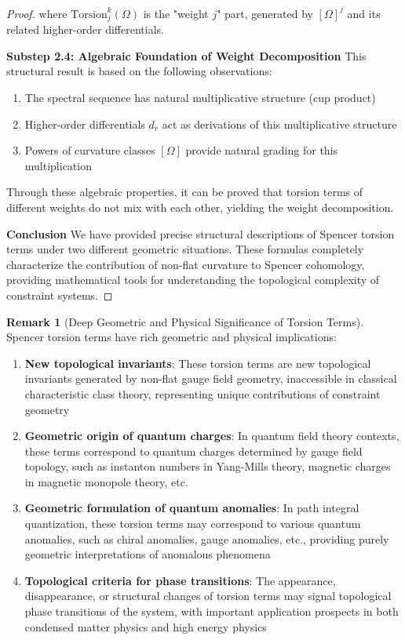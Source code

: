 \documentclass[a4paper,12pt]{extarticle}
\theoremstyle{definition}
\newtheorem{remark}{Remark}
\begin{document}
\begin{proof}
where $\text{Torsion}^k_j(\Omega)$ is the "weight $j$" part, generated by $[\Omega]^j$ and its related higher-order differentials.

\textbf{Substep 2.4: Algebraic Foundation of Weight Decomposition}
This structural result is based on the following observations:
\begin{enumerate}
\item The spectral sequence has natural multiplicative structure (cup product)
\item Higher-order differentials $d_r$ act as derivations of this multiplicative structure
\item Powers of curvature classes $[\Omega]$ provide natural grading for this multiplication
\end{enumerate}

Through these algebraic properties, it can be proved that torsion terms of different weights do not mix with each other, yielding the weight decomposition.

\textbf{Conclusion}
We have provided precise structural descriptions of Spencer torsion terms under two different geometric situations. These formulas completely characterize the contribution of non-flat curvature to Spencer cohomology, providing mathematical tools for understanding the topological complexity of constraint systems.
\end{proof}

\begin{remark}[Deep Geometric and Physical Significance of Torsion Terms]
Spencer torsion terms have rich geometric and physical implications:

\begin{enumerate}
\item \textbf{New topological invariants}: These torsion terms are new topological invariants generated by non-flat gauge field geometry, inaccessible in classical characteristic class theory, representing unique contributions of constraint geometry

\item \textbf{Geometric origin of quantum charges}: In quantum field theory contexts, these terms correspond to quantum charges determined by gauge field topology, such as instanton numbers in Yang-Mills theory, magnetic charges in magnetic monopole theory, etc.

\item \textbf{Geometric formulation of quantum anomalies}: In path integral quantization, these torsion terms may correspond to various quantum anomalies, such as chiral anomalies, gauge anomalies, etc., providing purely geometric interpretations of anomalous phenomena

\item \textbf{Topological criteria for phase transitions}: The appearance, disappearance, or structural changes of torsion terms may signal topological phase transitions of the system, with important application prospects in both condensed matter physics and high energy physics
\end{enumerate}
\end{remark}
\end{document}
